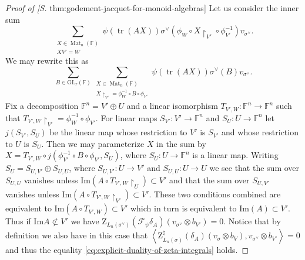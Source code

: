 \documentclass[12pt, reqno]{amsart}
\theoremstyle{definition}
\newcommand{\Cref}[1]{\zcref[S]{#1}}
\newcommand{\ImageOf}{\mathrm{Im}}
\newcommand{\zetaIntegral}{\mathrm{Z}}
\newcommand{\naturalZetaIntegral}{\mathrm{Z}^{\natural}}
\newcommand{\innerproduct}[2]{\left\langle #1,#2\right\rangle}
\newcommand{\fieldCharacter}{\psi}
\newcommand{\trace}{\operatorname{tr}}
\newcommand{\GL}{\mathrm{GL}}
\newcommand{\finiteField}{\mathbb{F}}
\newcommand{\squareMatrix}{\operatorname{Mat}}
\newcommand{\fourierTransform}[1]{\mathcal{F}_{#1}}
\begin{document}
\begin{proof}[Proof of \Cref{thm:godement-jacquet-for-monoid-algebras}]
		Let us consider the inner sum
		\begin{displaymath}
			\sum_{\substack{X \in \squareMatrix_n\left(\finiteField\right)\\
					X V' = W}} \fieldCharacter\left(\trace\left(AX\right)\right) \sigma^{\vee}\left(\phi_W \circ X \restriction_{V'} \circ \phi_{V'}^{-1}\right)v_{\sigma^{\vee}}.
		\end{displaymath}
		We may rewrite this as
		\begin{equation}\label{eq:sum-over-B}
			\sum_{B \in \GL_r\left(\finiteField\right)}
			\sum_{\substack{X \in \squareMatrix_n\left(\finiteField\right) \\
					X \restriction_{V'} = \phi_W^{-1} \circ B \circ \phi_{V'}}} \fieldCharacter\left(\trace\left(AX\right)\right) \sigma^{\vee}\left(B\right)v_{\sigma^{\vee}}.
		\end{equation}
		Fix a decomposition $\finiteField^n = V' \oplus U$ and a linear isomorphism $T_{V',W} \colon \finiteField^n \to \finiteField^n$ such that $T_{V',W} \restriction_{V'} = \phi_W^{-1} \circ \phi_{V'}$. For linear maps $S_{V'} \colon V' \to \finiteField^n$ and $S_U \colon U \to \finiteField^n$ let $j\left(S_{V'},S_U\right)$ be the linear map whose restriction to $V'$ is $S_{V'}$ and whose restriction to $U$ is $S_U$. Then we may parameterize $X$ in the sum by $X = T_{V',W} \circ j\left(\phi_{V'}^{-1} \circ B \circ \phi_{V'}, S_U\right)$, where $S_U \colon U \to \finiteField^n$ is a linear map. Writing $S_U = S_{U,V'} \oplus S_{U,U}$, where $S_{U,V'} \colon U \to V'$ and $S_{U,U} \colon U \to U$ we see that the sum over $S_{U,U}$ vanishes unless $\ImageOf\left(A \circ T_{V',W} \restriction_{U} \right) \subset V'$ and that the sum over $S_{U,V'}$ vanishes unless $\ImageOf\left(A \circ T_{V',W} \restriction_{V'} \right) \subset V'$. These two conditions combined are equivalent to $\ImageOf\left(A \circ T_{V',W}\right) \subset V'$ which in turn is equivalent to $\ImageOf\left(A\right) \subset V'$. Thus if $\ImageOf A \not\subset V'$ we have $\zetaIntegral_{L_n\left(\sigma^{\vee}\right)}\left(\fourierTransform{\fieldCharacter}\delta_A\right)\left(v_{\sigma^{\vee}} \otimes b_{V'}\right) = 0$. Notice that by definition we also have in this case that $\innerproduct{\naturalZetaIntegral_{L_n\left(\sigma\right)}\left(\delta_A\right)\left(v_{\sigma} \otimes b_V\right)}{v_{\sigma^{\vee}} \otimes b_{V'}}=0$ and thus the equality \eqref{eq:explicit-duality-of-zeta-integrals} holds.
		

\end{proof}
\end{document}
